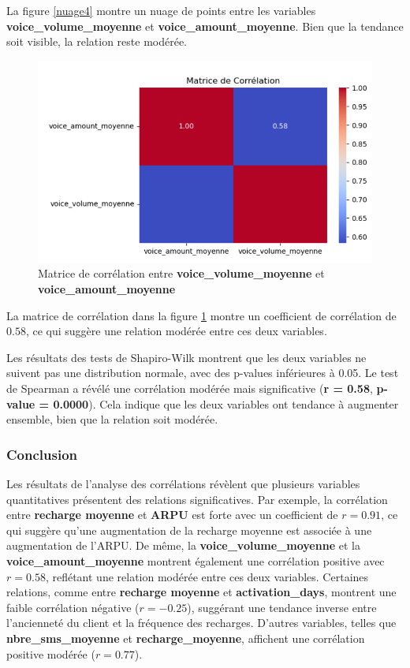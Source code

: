 \noindent
La figure \ref{nuage4} montre un nuage de points entre les variables \textbf{voice\_volume\_moyenne} et \textbf{voice\_amount\_moyenne}. Bien que la tendance soit visible, la relation reste modérée.

\begin{figure}[H]
    \centering
    \includegraphics[width=0.6\linewidth]{capture_sas_51.png}
    \caption{Matrice de corrélation entre \textbf{voice\_volume\_moyenne} et \textbf{voice\_amount\_moyenne}}
    \label{matrice4}
\end{figure}

\noindent
La matrice de corrélation dans la figure \ref{matrice4} montre un coefficient de corrélation de \(0.58\), ce qui suggère une relation modérée entre ces deux variables.

\noindent
Les résultats des tests de Shapiro-Wilk montrent que les deux variables ne suivent pas une distribution normale, avec des p-values inférieures à 0.05. Le test de Spearman a révélé une corrélation modérée mais significative (\textbf{r = 0.58}, \textbf{p-value = 0.0000}). Cela indique que les deux variables ont tendance à augmenter ensemble, bien que la relation soit modérée.

\subsubsection*{Conclusion }

Les résultats de l'analyse des corrélations révèlent que plusieurs variables quantitatives présentent des relations significatives. Par exemple, la corrélation entre \textbf{recharge moyenne} et \textbf{ARPU} est forte avec un coefficient de \(r = 0.91\), ce qui suggère qu'une augmentation de la recharge moyenne est associée à une augmentation de l'ARPU. De même, la \textbf{voice\_volume\_moyenne} et la \textbf{voice\_amount\_moyenne} montrent également une corrélation positive avec \(r = 0.58\), reflétant une relation modérée entre ces deux variables.
Certaines relations, comme entre \textbf{recharge moyenne} et \textbf{activation\_days}, montrent une faible corrélation négative (\(r = -0.25\)), suggérant une tendance inverse entre l'ancienneté du client et la fréquence des recharges. D'autres variables, telles que \textbf{nbre\_sms\_moyenne} et \textbf{recharge\_moyenne}, affichent une corrélation positive modérée (\(r = 0.77\)).

